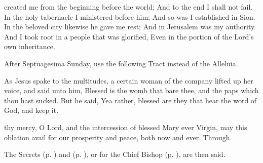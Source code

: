  created me from the beginning before the world; And to the end I shall not fail. In the holy tabernacle I ministered before him; And so was I established in Sion. In the beloved city likewise he gave me rest; And in Jerusalem was my authority. And I took root in a people that was glorified, Even in the portion of the Lord’s own inheritance.

\begin{rubric}
    After Septuagesima Sunday, use the following Tract instead of the Alleluia.
\end{rubric}


 As Jesus spake to the multitudes, a certain woman of the company lifted up her voice, and said unto him, Blessed is the womb that bare thee, and the paps which thou hast sucked. But he said, Yea rather, blessed are they that hear the word of God, and keep it.


\secret
{} thy mercy, O Lord, and the intercession of blessed Mary ever Virgin, may this oblation avail for our prosperity and peace, both now and ever. Through.
\begin{rubric}
    The Secrets  (p. \pageref{SPHolyGhost}) and  (p. \pageref{SPAgainst}), or for the Chief Bishop (p. \pageref{SPChiefBishop}), are then said.
\end{rubric}

